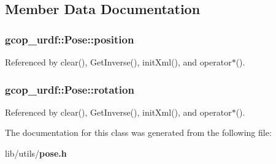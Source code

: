 \subsection{\-Member \-Data \-Documentation}
\subsubsection[{position}]{ {\bf gcop\-\_\-urdf\-::\-Pose\-::position}}\label{classgcop__urdf_1_1Pose_aa0b9447f58c4cecac158698c45077657}


\-Referenced by clear(), \-Get\-Inverse(), init\-Xml(), and operator$\ast$().

\subsubsection[{rotation}]{ {\bf gcop\-\_\-urdf\-::\-Pose\-::rotation}}\label{classgcop__urdf_1_1Pose_ace2968003e92d59ad927b05133ba6cc2}


\-Referenced by clear(), \-Get\-Inverse(), init\-Xml(), and operator$\ast$().



\-The documentation for this class was generated from the following file\-:\begin{DoxyCompactItemize}
\item 
lib/utils/{\bf pose.\-h}\end{DoxyCompactItemize}
